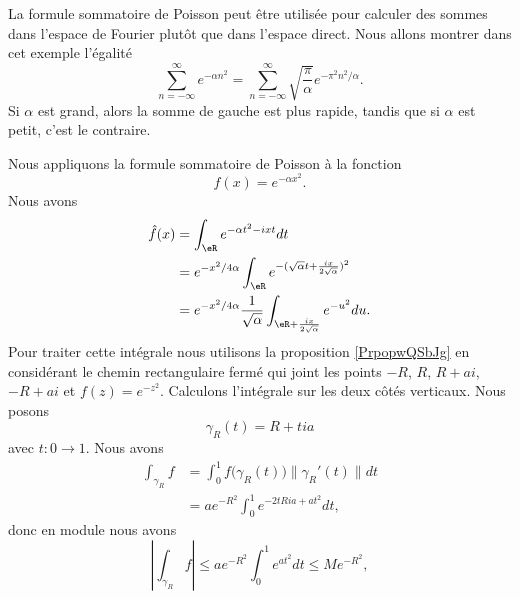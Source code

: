 \begin{example}\label{ExDLjesf}
    La formule sommatoire de Poisson peut être utilisée pour calculer des sommes dans l'espace de Fourier plutôt que dans l'espace direct. Nous allons montrer dans cet exemple l'égalité
    \begin{equation}
        \sum_{n=-\infty}^{\infty} e^{-\alpha n^2}=\sum_{n=-\infty}^{\infty}\sqrt{\frac{ \pi }{ \alpha }} e^{-\pi^2 n^2/\alpha}.
    \end{equation}
    Si \( \alpha\) est grand, alors la somme de gauche est plus rapide, tandis que si \( \alpha\) est petit, c'est le contraire.

    Nous appliquons la formule sommatoire de Poisson à la fonction
    \begin{equation}
        f(x)= e^{-\alpha x^2}.
    \end{equation}
    Nous avons
    \begin{subequations}        \label{EqCDeLht}
        \begin{align}
            \hat f(x)&=\int_{\eR} e^{-\alpha t^2-ixt}dt\\
            &= e^{-x^2/4\alpha}\int_{\eR}e^{ -(\sqrt{\alpha}t+\frac{ ix }{ 2\sqrt{\alpha} })^2 }\\
            &= e^{-x^2/4\alpha}\frac{1}{ \sqrt{\alpha} }\int_{\eR+\frac{ ix }{ 2\sqrt{\alpha} }} e^{-u^2}du.
        \end{align}
    \end{subequations}
    Pour traiter cette intégrale nous utilisons la proposition \ref{PrpopwQSbJg} en considérant le chemin rectangulaire fermé qui joint les points \( -R\), \( R\), \( R+ai\), \( -R+ai\) et \( f(z)= e^{-z^2}\). Calculons l'intégrale sur les deux côtés verticaux. Nous posons
    \begin{equation}
        \gamma_R(t)=R+tia
    \end{equation}
    avec \( t\colon 0\to 1\). Nous avons
    \begin{subequations}
        \begin{align}
            \int_{\gamma_R}f&=\int_0^1f\big( \gamma_R(t) \big)\| \gamma_R'(t) \|dt\\
            &=a e^{-R^2}\int_0^1 e^{-2tRia+at^2}dt,
        \end{align}
    \end{subequations}
    donc en module nous avons
    \begin{equation}
        | \int_{\gamma_R}f |\leq a e^{-R^2}\int_0^1 e^{at^2}dt\leq M e^{-R^2},
    \end{equation}

\end{example}
